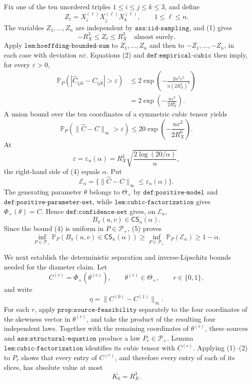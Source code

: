 Fix one of the ten unordered triples \(1\leq i\leq j\leq k\leq3\), and define
\[
 Z_\ell=X_i^{(\ell)}X_j^{(\ell)}X_k^{(\ell)},
 \qquad 1\leq\ell\leq n.
\]
The variables \(Z_1,\ldots,Z_n\) are independent by \(\texttt{ass:iid-sampling}\), and (1) gives
\[
 -R_X^3\leq Z_\ell\leq R_X^3
 \quad\text{almost surely}.
\]
Apply \(\texttt{lem:hoeffding-bounded-sum}\) to \(Z_1,\ldots,Z_n\) and then to \(-Z_1,\ldots,-Z_n\), in each case with deviation \(n\varepsilon\).  Equations (2) and \(\texttt{def:empirical-cubic}\) then imply, for every \(\varepsilon>0\),
\[
 \begin{aligned}
 \mathbb P_P\!\left(
   |\widehat C_{ijk}-C_{ijk}|>\varepsilon
 \right)
 &\leq
 2\exp\!\left(
 -\frac{2n^2\varepsilon^2}{n(2R_X^3)^2}
 \right)\\
 &=2\exp\!\left(-\frac{n\varepsilon^2}{2R_X^6}\right).
 \end{aligned}                                                     \tag{3}
\]
A union bound over the ten coordinates of a symmetric cubic tensor yields
\[
 \mathbb P_P\!\left(\|\widehat C-C\|_\infty>\varepsilon\right)
 \leq20\exp\!\left(-\frac{n\varepsilon^2}{2R_X^6}\right).        \tag{4}
\]
At
\[
 \varepsilon=\varepsilon_n(\alpha)
 =R_X^3\sqrt{\frac{2\log(20/\alpha)}{n}},
\]
the right-hand side of (4) equals \(\alpha\).  Put
\[
 \mathcal E_n
 =\{\|\widehat C-C\|_\infty\leq\varepsilon_n(\alpha)\}.
\]
The generating parameter \(\theta\) belongs to \(\Theta_+\) by \(\texttt{def:positive-model}\) and \(\texttt{def:positive-parameter-set}\), while \(\texttt{lem:cubic-factorization}\) gives \(\Phi_+(\theta)=C\).  Hence \(\texttt{def:confidence-set}\) gives, on \(\mathcal E_n\),
\[
 B_\pi(u,v)\in\mathsf{CS}_n(\alpha).                              \tag{5}
\]
Since the bound (4) is uniform in \(P\in\mathcal P_+\), (5) proves
\[
 \inf_{P\in\mathcal P_+}
 \mathbb P_P\!\left(B_\pi(u,v)\in\mathsf{CS}_n(\alpha)\right)
 \geq
 \inf_{P\in\mathcal P_+}\mathbb P_P(\mathcal E_n)
 \geq1-\alpha.                                                     \tag{6}
\]

We next establish the deterministic separation and inverse-Lipschitz bounds needed for the diameter claim.  Let
\[
 C^{(r)}=\Phi_+(\theta^{(r)}),
 \qquad \theta^{(r)}\in\Theta_+,
 \qquad r\in\{0,1\},
\]
and write
\[
 \eta=\|C^{(0)}-C^{(1)}\|_\infty.
\]
For each \(r\), apply \(\texttt{prop:source-feasibility}\) separately to the four coordinates of the skewness vector in \(\theta^{(r)}\), and take the product of the resulting four independent laws.  Together with the remaining coordinates of \(\theta^{(r)}\), these sources and \(\texttt{ass:structural-equation}\) produce a law \(P_r\in\mathcal P_+\).  Lemma \(\texttt{lem:cubic-factorization}\) identifies its cubic tensor with \(C^{(r)}\).  Applying (1)--(2) to \(P_r\) shows that every entry of \(C^{(r)}\), and therefore every entry of each of its slices, has absolute value at most
\[
 K_0=R_X^3.                                                        \tag{7}
\]

